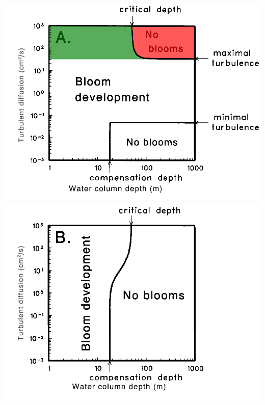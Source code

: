 \begin{frame}
\begin{columns}
    \includegraphics[width=\textwidth]{../img/result_Huis_lowvel}
    \includegraphics[width=\textwidth]{../img/result_Huis_hivel}

  \end{columns}
\end{frame}
